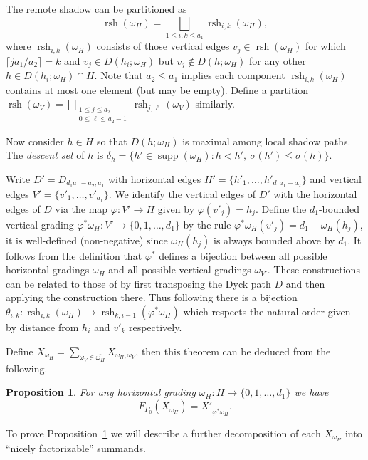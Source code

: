 \documentclass{amsart}
\newtheorem{proposition}[theorem]{Proposition}
\newcommand{\supp}{\operatorname{supp}}
\newcommand{\rsh}{\operatorname{rsh}}
\begin{document}
The remote shadow can be partitioned as 
\[\rsh(\omega_H)=\bigsqcup\limits_{1\le i,k\le a_1}\rsh_{i,k}(\omega_H),\] 
where $\rsh_{i,k}(\omega_H)$ consists of those vertical edges $v_j\in\rsh(\omega_H)$ for which $\lceil ja_1/a_2\rceil=k$ and $v_j\in D(h_i;\omega_H)$ but $v_j\notin D(h;\omega_H)$ for any other $h\in D(h_i;\omega_H)\cap H$.  Note that $a_2\le a_1$ implies each component $\rsh_{i,k}(\omega_H)$ contains at most one element (but may be empty).  Define a partition $\rsh(\omega_V)=\bigsqcup\limits_{\substack{1\le j\le a_2\\0\le\ell\le a_2-1}}\rsh_{j,\ell}(\omega_V)$ similarly.  

Now consider $h\in H$ so that $D(h;\omega_H)$ is maximal among local shadow paths.  The \emph{descent set} of $h$ is $\delta_h=\{h'\in\supp(\omega_H):h<h',\ \sigma(h')\le\sigma(h)\}$.  


 

Write $D'=D_{d_1a_1-a_2,a_1}$ with horizontal edges $H'=\{h'_1,\ldots,h'_{d_1a_1-a_2}\}$ and vertical edges $V'=\{v'_1,\ldots,v'_{a_1}\}$.  We identify the vertical edges of $D'$ with the horizontal edges of $D$ via the map $\varphi:V'\to H$ given by $\varphi(v'_j)=h_j$.  Define the $d_1$-bounded vertical grading $\varphi^*\omega_H:V'\to\{0,1,\ldots,d_1\}$ by the rule $\varphi^*\omega_H(v'_j)=d_1-\omega_H(h_j)$, it is well-defined (non-negative) since $\omega_H(h_j)$ is always bounded above by $d_1$.  It follows from the definition that $\varphi^*$ defines a bijection between all possible horizontal gradings $\omega_H$ and all possible vertical gradings $\omega_{V'}$.  These constructions can be related to those of \cite[Section 4.2]{rupel2} by first transposing the Dyck path $D$ and then applying the construction there.  Thus following \cite[Corollary 4.18]{rupel2} there is a bijection $\theta_{i,k}:\rsh_{i,k}(\omega_H)\to\rsh_{k,i-1}(\varphi^*\omega_H)$ which respects the natural order given by distance from $h_i$ and $v'_k$ respectively.



Define $X_{\overline{\omega_H}}=\sum\limits_{\omega_V\in\overline{\omega_H}} X_{\omega_H,\omega_V}$, then this theorem can be deduced from the following.  
\begin{proposition}\label{prop:restricted}
 For any horizontal grading $\omega_H:H\to\{0,1,\ldots,d_1\}$ we have
 \[F_{P_0}(X_{\overline{\omega_H}})=X'_{\overline{\varphi^*\omega_H}}.\]
\end{proposition}
To prove Proposition~\ref{prop:restricted} we will describe a further decomposition of each $X_{\overline{\omega_H}}$ into ``nicely factorizable'' summands.  
\end{document}
